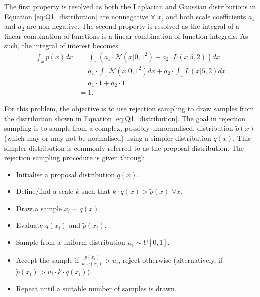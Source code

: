 \documentclass{article}
\begin{document}
	The first property is resolved as both the Laplacian and Gaussian distributions in Equation \eqref{eq:Q1_distribution} are nonnegative $\forall$ $x$, and both scale coefficients $a_1$ and $a_2$ are non-negative. The second property is resolved as the integral of a linear combination of functions is a linear combination of function integrals. As such, the integral of interest becomes
	\begin{equation}
		\begin{aligned}
		\int_x p(x)dx &= \int_x (a_1 \cdot \mathcal{N}(x \vert 0, 1^2) + a_2 \cdot L(x \vert 5, 2)) dx\\
		&= a_1 \cdot \int_x \mathcal{N}(x \vert 0, 1^2)dx + a_2 \cdot \int_x L(x \vert 5, 2) dx \\
		&= a_1 \cdot 1 + a_2 \cdot 1 \\
		&= 1.
		\end{aligned}
	\end{equation}

	For this problem, the objective is to use rejection sampling to draw samples from the distribution shown in Equation \eqref{eq:Q1_distribution}. The goal in rejection sampling is to sample from a complex, possibly unnormalised, distribution $\tilde{p}(x)$ (which may or may not be normalised) using a simpler distribution $q(x)$. This simpler distribution is commonly referred to as the proposal distribution. The rejection sampling procedure is given through
	\begin{itemize}
		\item Initialise a proposal distribution $q(x)$.
		\item Define/find a scale $k$ such that $k \cdot q(x) > \tilde{p}(x)$ $\forall x$.
		\item Draw a sample $x_i \sim q(x)$.
		\item Evaluate $q(x_i)$ and $\tilde{p}(x_i)$.
		\item Sample from a uniform distribution $u_i \sim U[0, 1]$.
		\item Accept the sample if $\frac{\tilde{p}(x_i)}{k \cdot q(x_i)} > u_i$, reject otherwise (alternatively, if $\tilde{p}(x_i) > u_i \cdot k \cdot q(x_i)$).
		\item Repeat until a suitable number of samples is drawn.
	\end{itemize}
\end{document}
